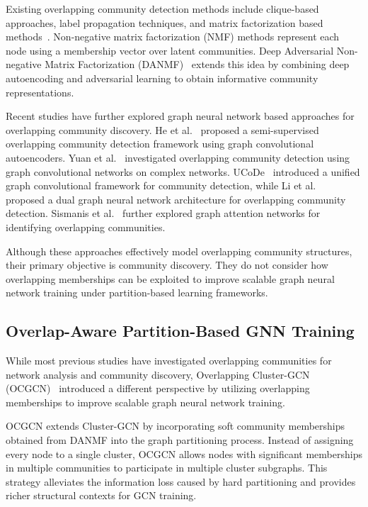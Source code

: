 \documentclass[pdflatex,sn-mathphys-num]{sn-jnl}%
\theoremstyle{thmstyleone}%
\theoremstyle{thmstyletwo}%
\theoremstyle{thmstylethree}%
\begin{document}
Existing overlapping community detection methods include clique-based approaches, label propagation techniques, and matrix factorization based methods~\citep{Shang2014}.
Non-negative matrix factorization (NMF) methods represent each node using a membership vector over latent communities.
Deep Adversarial Non-negative Matrix Factorization (DANMF)~\citep{DANMF} extends this idea by combining deep autoencoding and adversarial learning to obtain informative community representations.

Recent studies have further explored graph neural network based approaches for overlapping community discovery.
He et al.~\citep{He2022} proposed a semi-supervised overlapping community detection framework using graph convolutional autoencoders.
Yuan et al.~\citep{Yuan2022} investigated overlapping community detection using graph convolutional networks on complex networks.
UCoDe~\citep{UCoDe2023} introduced a unified graph convolutional framework for community detection, while Li et al.~\citep{Li2023} proposed a dual graph neural network architecture for overlapping community detection.
Sismanis et al.~\citep{Sismanis2024} further explored graph attention networks for identifying overlapping communities.

Although these approaches effectively model overlapping community structures, their primary objective is community discovery.
They do not consider how overlapping memberships can be exploited to improve scalable graph neural network training under partition-based learning frameworks.

\subsection{Overlap-Aware Partition-Based GNN Training}
\label{subsec:overlap-aware}


While most previous studies have investigated overlapping communities for network analysis and community discovery, Overlapping Cluster-GCN (OCGCN)~\citep{Amintoosi2021} introduced a different perspective by utilizing overlapping memberships to improve scalable graph neural network training.

OCGCN extends Cluster-GCN by incorporating soft community memberships obtained from DANMF into the graph partitioning process.
Instead of assigning every node to a single cluster, OCGCN allows nodes with significant memberships in multiple communities to participate in multiple cluster subgraphs.
This strategy alleviates the information loss caused by hard partitioning and provides richer structural contexts for GCN training.
\end{document}
